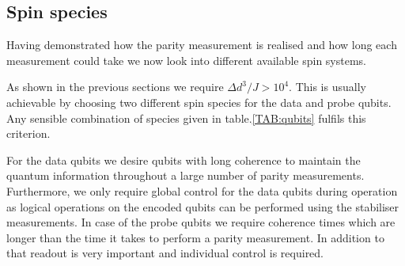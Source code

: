 
\subsection{Spin species}

Having demonstrated how the parity measurement is realised and how long each measurement could take we now look into different available spin systems. 

As shown in the previous sections we require $\Delta d^3/ J > 10^4$. This is usually achievable by choosing two different spin species for the data and probe qubits. Any sensible combination of species given in table.\@ \ref*{TAB:qubits} fulfils this criterion.

For the data qubits we desire qubits with long coherence to maintain the quantum information throughout a large number of parity measurements. Furthermore, we only require global control for the data qubits during operation as logical operations on the encoded qubits can be performed using the stabiliser measurements.
In case of the probe qubits we require coherence times which are longer than the time it takes to perform a parity measurement. In addition to that readout is very important and individual control is required.

